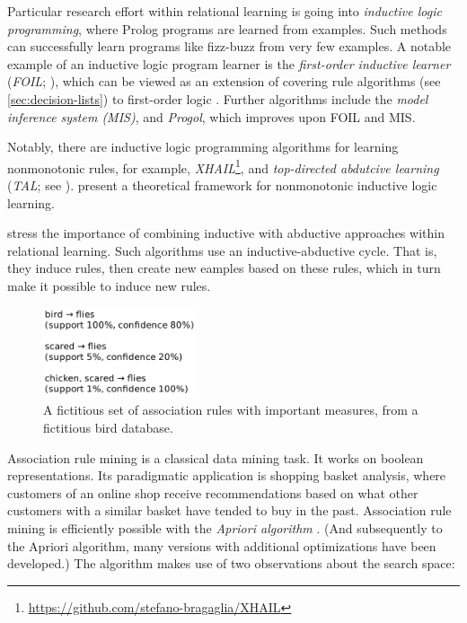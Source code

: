 Particular research effort within relational learning is going into \textit{inductive logic programming}, where Prolog programs are learned from examples. Such methods can successfully learn programs like fizz-buzz from very few examples. A notable example of an inductive logic program learner is the \textit{first-order inductive learner} (\textit{FOIL}; \citet{quinlanLearningLogicalDefinitions1990}), which can be viewed as an extension of covering rule algorithms (see \autoref{sec:decision-lists}) to first-order logic \citep[p.~362f.]{hanDataMiningConcepts2011}. Further algorithms include the \textit{model inference system (MIS)}, and \textit{Progol}, which improves upon FOIL and MIS. 

Notably, there are inductive logic programming algorithms for learning nonmonotonic rules, for example, \textit{XHAIL}\footnote{\url{https://github.com/stefano-bragaglia/XHAIL}}, and \textit{top-directed abdutcive learning} (\textit{TAL}; see \citet{corapiInductiveLogicProgramming2010}). \citet{dimopoulosLearningNonmonotonicLogic1995} present a theoretical framework for nonmonotonic inductive logic learning.

\cite{kakasAbductionArgumentationExplainable2020} stress the importance of combining inductive with abductive approaches within relational learning. Such algorithms use an inductive-abductive cycle. That is, they induce rules, then create new eamples based on these rules, which in turn make it possible to induce new rules.

\label{sec:association-rules}

\begin{figure}[htb]
        \centering
        \includegraphics[width=0.4\textwidth]{images/association-rules.png}
        \caption{A fictitious set of association rules with important measures, from a fictitious bird database.}
        \label{fig:association-rules}
\end{figure}

Association rule mining is a classical data mining task. It works on boolean representations. Its paradigmatic application is shopping basket analysis, where customers of an online shop receive recommendations based on what other customers with a similar basket have tended to buy in the past. Association rule mining is efficiently possible with the \textit{Apriori algorithm} \citep{agrawalFastAlgorithmsMining1994}. (And subsequently to the Apriori algorithm, many versions with additional optimizations have been developed.) The algorithm makes use of two observations about the search space: 

